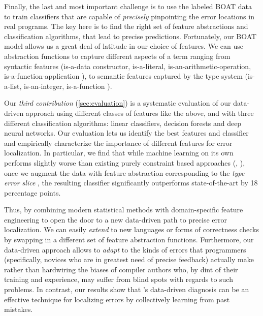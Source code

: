 %
Finally, the last and most important challenge is to
use the labeled BOAT data to train classifiers that
are capable of \emph{precisely} pinpointing the error
locations in real programs.
%
The key here is to find the right set of feature
abstractions and classification algorithms, that
lead to precise predictions.
%
Fortunately, our BOAT model allows us a great deal of
latitude in our choice of features.
%
We can use abstraction functions to capture different
aspects of a term ranging from
%
syntactic features (\eg is-a-data constructor, is-a-literal,
is-an-arithmetic-operation, is-a-function-application \etc),
%
to semantic features captured by the type system (\eg is-a-list,
is-an-integer, is-a-function \etc).

Our \emph{third contribution} (\autoref{sec:evaluation})
is a systematic evaluation of our data-driven approach
using different classes of features like the above, and
with three different classification algorithms: linear
classifiers, decision forests and deep neural networks.
%
Our evaluation lets us identify the best features and
classifier and empirically characterize the importance
of different features for error localization.
%
In particular, we find that while machine learning
on its own performs slightly worse than existing
purely constraint based approaches (\eg \ocaml, \sherrloc),
once we augment the data with feature abstraction
corresponding to the \emph{type error slice} \cite{Tip2001-qp},
the resulting classifier significantly outperforms
state-of-the-art by 18 percentage points.

Thus, by combining modern statistical methods
with domain-specific feature engineering
to open the door to a new data-driven
path to precise error localization.
%
We can easily \emph{extend} \toolname to
new languages or forms of correctness
checks by swapping in a different
set of feature abstraction functions.
%
Furthermore, our data-driven approach
allows \toolname to \emph{adapt} to
the kinds of errors that programmers
(specifically, novices who are in greatest
need of precise feedback) actually make
rather than hardwiring the biases of
compiler authors who, by dint of their
training and experience, may suffer from
blind spots with regards to such problems.
%
In contrast, our results show that \toolname's
data-driven diagnosis can be an effective
technique for localizing errors by collectively
learning from past mistakes.

